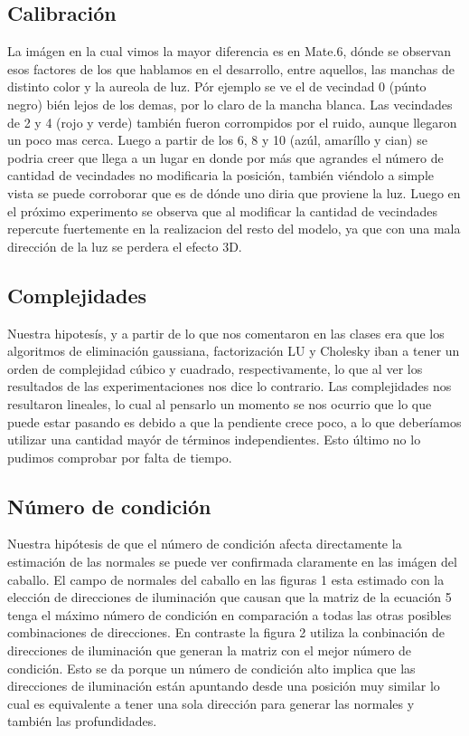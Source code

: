 \subsection{Calibraci\'on}

\indent La imágen en la cual vimos la mayor diferencia es en Mate.6, d\'onde se observan esos factores de los que hablamos en el desarrollo, entre aquellos, las manchas de distinto color y la aureola de luz. P\'or ejemplo se ve el de vecindad 0 (p\'unto negro) bi\'en lejos de los demas, por lo claro de la mancha blanca. Las vecindades de 2 y 4 (rojo y verde) tambi\'en fueron corrompidos por el ruido, aunque llegaron un poco mas cerca. Luego a partir de los 6, 8 y 10 (az\'ul, amar\'illo y cian) se podria creer que llega a un lugar en donde por m\'as que agrandes el n\'umero de cantidad de vecindades no modificaria la posici\'on, tambi\'en vi\'endolo a simple vista se puede corroborar que es de d\'onde uno diria que proviene la luz.
Luego en el pr\'oximo experimento se observa que al modificar la cantidad de vecindades repercute fuertemente en la realizacion del resto del modelo, ya que con una mala direcci\'on de la luz se perdera el efecto 3D. \par

\subsection{Complejidades}

\indent Nuestra hipotesís, y a partir de lo que nos comentaron en las clases era que los algoritmos de eliminación gaussiana, factorización LU y Cholesky iban a tener un orden de complejidad cúbico y cuadrado, respectivamente, lo que al ver los resultados de las experimentaciones nos dice lo contrario. Las complejidades nos resultaron lineales, lo cual al pensarlo un momento se nos ocurrio que lo que puede estar pasando es debido a que la pendiente crece poco, a lo que deber\'iamos utilizar una cantidad may\'or de t\'erminos independientes. Esto \'ultimo no lo pudimos comprobar por falta de tiempo.  \par


\subsection{N\'umero de condici\'on}


\indent Nuestra hipótesis de que el n\'umero de condici\'on afecta directamente la estimaci\'on de las normales se puede ver confirmada claramente en las im\'agen del caballo. El campo de normales del caballo  en las figuras 1  esta estimado con la elección de direcciones de iluminaci\'on que causan que la matriz de la ecuaci\'on 5 tenga el m\'aximo n\'umero de condici\'on en comparaci\'on a todas las otras posibles combinaciones de direcciones. En contraste la figura 2 utiliza la conbinaci\'on de direcciones de iluminaci\'on que generan la matriz con el mejor n\'umero de condici\'on. Esto se da porque un n\'umero de condici\'on alto implica que las direcciones de iluminación est\'an apuntando desde una posici\'on muy similar lo cual es equivalente a tener una sola direcci\'on para generar las normales y tambi\'en las profundidades. \par

